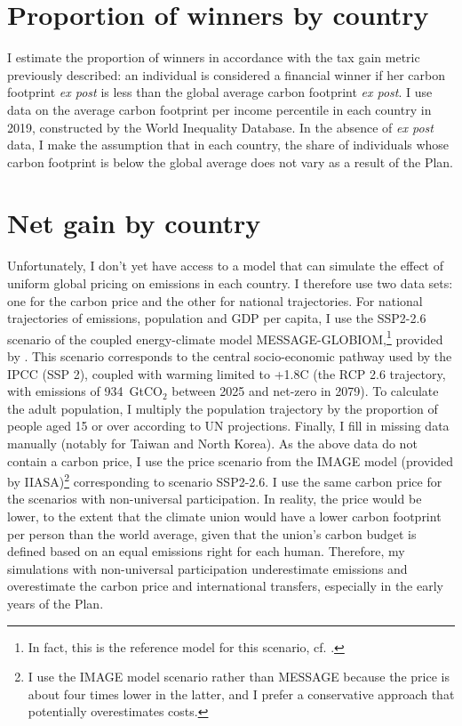 \documentclass[a5paper,english,openany]{memoir}
\begin{document}
\section{Proportion of winners by country}

I estimate the proportion of winners in accordance with the tax gain metric previously described: an individual is considered a financial winner if her carbon footprint \textit{ex post} is less than the global average carbon footprint \textit{ex post}. I use data on the average carbon footprint per income percentile in each country in 2019, constructed by the World Inequality Database. In the absence of \textit{ex post} data, I make the assumption that in each country, the share of individuals whose carbon footprint is below the global average does not vary as a result of the Plan.

\section{Net gain by country}\label{app:pays} 

Unfortunately, I don't yet have access to a model that can simulate the effect of uniform global pricing on emissions in each country. I therefore use two data sets: one for the carbon price and the other for national trajectories. For national trajectories of emissions, population and GDP per capita, I use the SSP2-2.6 scenario of the coupled energy-climate model MESSAGE-GLOBIOM,\footnote{In fact, this is the reference model for this scenario, cf. \cite{fricko_marker_2017}.} provided by \cite{gutschow_country-resolved_2021}. This scenario corresponds to the central socio-economic pathway used by the IPCC (SSP 2), coupled with warming limited to +1.8\textdegree{}C (the RCP 2.6 trajectory, with emissions of 934~GtCO$_\text{2}$ between 2025 and net-zero in 2079). To calculate the adult population, I multiply the population trajectory by the proportion of people aged 15 or over according to UN projections. Finally, I fill in missing data manually (notably for Taiwan and North Korea). As the above data do not contain a carbon price, I use the price scenario from the IMAGE model (provided by IIASA)\footnote{I use the IMAGE model scenario rather than MESSAGE because the price is about four times lower in the latter, and I prefer a conservative approach that potentially overestimates costs. 
} corresponding to scenario SSP2-2.6. I use the same carbon price for the scenarios with non-universal participation. In reality, the price would be lower, to the extent that the climate union would have a lower carbon footprint per person than the world average, given that the union's carbon budget is defined based on an equal emissions right for each human. Therefore, my simulations with non-universal participation underestimate emissions and overestimate the carbon price and international transfers, especially in the early years of the Plan.
\end{document}
